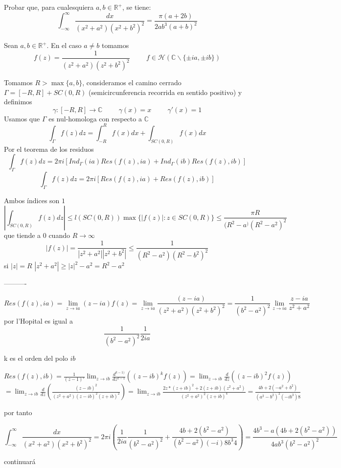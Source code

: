 \begin{ejer}
	Probar que, para cualesquiera $a,b\in\mathbb{R}^+$, se tiene:
	$$ \int_{-\infty}^{\infty} \frac{dx}{(x^2+a^2)(x^2+b^2)^2} = \frac{\pi (a+2b)}{2ab^3(a+b)^2} $$
\end{ejer}
\begin{sol}
	Sean $a,b\in\mathbb{R}^+$.
	En el caso $a\not = b$ tomamos $$f(z) = \frac{1}{(z^2+a^2)(z^2+b^2)^2} \hspace{1cm} f\in\mathcal{H}( \mathbb{C}\backslash\{ \pm ia, \pm ib \} )$$
	
	Tomamos $R>\max\{a,b\}$, consideramos el camino cerrado $\Gamma = [-R,R]+SC(0,R)$ (semicircunferencia recorrida en sentido positivo) y definimos
	$$\gamma : [-R,R]\rightarrow \mathbb{C} \hspace{1cm} \gamma(x)=x \hspace{1cm} \gamma '(x) = 1$$
	Usamos que $\Gamma$ es nul-homologa con respecto a $\mathbb{C}$
	$$\int_{\Gamma}f(z)dz = \int_{-R}^{R} f(x)dx + \int_{SC(0,R)} f(x)dx$$
	Por el teorema de los residuos 
	$$\int_{\Gamma}f(z)dz = 2\pi i [ Ind_{\Gamma}(ia)Res(f(z),ia) + Ind_{\Gamma}(ib)Res(f(z),ib) ]$$
	$$\int_{\Gamma}f(z)dz = 2\pi i [Res(f(z),ia) + Res(f(z),ib) ]$$
	
	Ambos índices son $1$
	$$|\int_{SC(0,R)} f(z)dz| \leq l(SC(0,R))\max \{ |f(z)| : z\in SC(0,R) \} \leq \frac{\pi R}{(R^2-a^)(R^2-a^2)^2}$$
	que tiende a $0$ cuando $R\rightarrow \infty$
	$$|f(z)| = \frac{1}{|z^2+a^2||z^2+b^2|} \leq \frac{1}{(R^2-a^2)(R^2-b^2)^2}$$
	si $|z|=R$
	$|z^2+a^2| \geq |z|^2 -a^2 = R^2-a^2$
	
	----------
	
	$$Res(f(z),ia) = \lim_{z\rightarrow ia} (z-ia)f(z) = \lim_{z\rightarrow ia} \frac{(z-ia)}{(z^2+a^2)(z^2+b^2)^2} = \frac{1}{(b^2-a^2)^2} \lim_{z\rightarrow ia} \frac{z-ia}{z^2+a^2}$$ 
	por l'Hopital es igual a
	$$\frac{1}{(b^2-a^2)^2}\frac{1}{2ia}$$
	
	k es el orden del polo $ib$
	
	$Res(f(z),ib) = \frac{1}{(z-1)'} \lim_{z\rightarrow ib} \frac{d^{k-1)}}{dz^{k-1}} ((z-ib)^k f(z)) = \lim_{z\rightarrow ib} \frac{d}{dz} ((z-ib)^2 f(z)) $
	$= \lim_{z\rightarrow ib} \frac{d}{dz} \left( \frac{(z-ib)^2}{(z^2+a^2)(z-ib)^2(z+ib)^2}  \right) 
	= \lim_{z\rightarrow ib}\frac{2z*(z+ib)^2 + 2(z+ib)(z^2+a^2)}{(z^2+a^2)^2 (z+ib)^4}
	= \frac{4b + 2(-a^2+b^2)}{(a^2-b^2)^2 (-ib^3)8}  $
	
	por tanto
	
	$$ \int_{-\infty}^{\infty} \frac{dx}{(x^2+a^2)(x^2+b^2)^2} = 
	2\pi i \left( \frac{1}{2ia}\frac{1}{(b^2-a^2)^2} + \frac{4b+2(b^2-a^2)}{(b^2-a^2)(-i)8b^3 4} \right) =
	\frac{4b^3-a(4b+2(b^2-a^2))}{4ab^3(b^2-a^2)^2}$$
	
	continuará
	
\end{sol}


